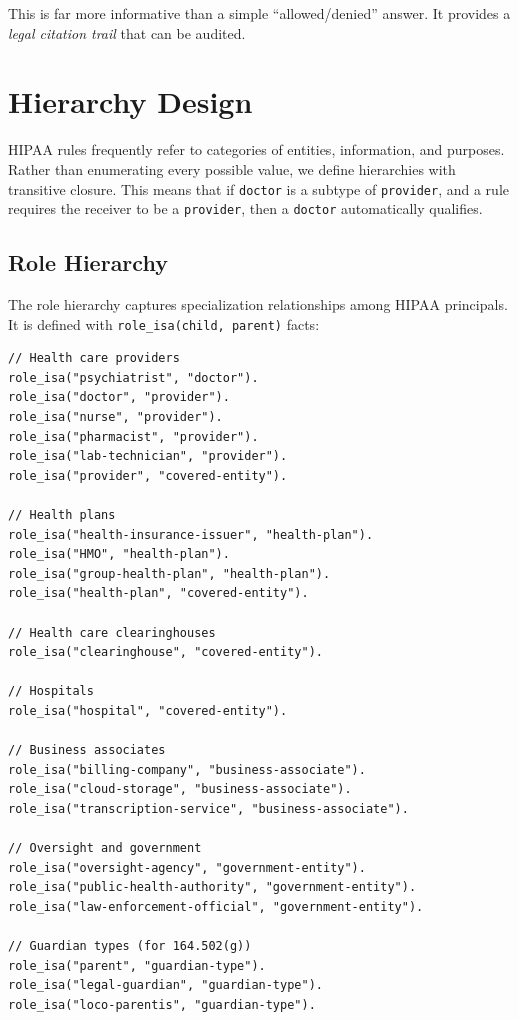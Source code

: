 \documentclass[11pt,letterpaper]{article}
\begin{document}
This is far more informative than a simple ``allowed/denied'' answer. It provides a \emph{legal citation trail} that can be audited.


\section{Hierarchy Design}
\label{sec:hierarchies}

HIPAA rules frequently refer to categories of entities, information, and purposes. Rather than enumerating every possible value, we define hierarchies with transitive closure. This means that if \texttt{doctor} is a subtype of \texttt{provider}, and a rule requires the receiver to be a \texttt{provider}, then a \texttt{doctor} automatically qualifies.

\subsection{Role Hierarchy}

The role hierarchy captures specialization relationships among HIPAA principals. It is defined with \texttt{role\_isa(child, parent)} facts:

\begin{lstlisting}[style=soufflestyle,caption={Role hierarchy from hipaa\_hierarchies.dl}]
// Health care providers
role_isa("psychiatrist", "doctor").
role_isa("doctor", "provider").
role_isa("nurse", "provider").
role_isa("pharmacist", "provider").
role_isa("lab-technician", "provider").
role_isa("provider", "covered-entity").

// Health plans
role_isa("health-insurance-issuer", "health-plan").
role_isa("HMO", "health-plan").
role_isa("group-health-plan", "health-plan").
role_isa("health-plan", "covered-entity").

// Health care clearinghouses
role_isa("clearinghouse", "covered-entity").

// Hospitals
role_isa("hospital", "covered-entity").

// Business associates
role_isa("billing-company", "business-associate").
role_isa("cloud-storage", "business-associate").
role_isa("transcription-service", "business-associate").

// Oversight and government
role_isa("oversight-agency", "government-entity").
role_isa("public-health-authority", "government-entity").
role_isa("law-enforcement-official", "government-entity").

// Guardian types (for 164.502(g))
role_isa("parent", "guardian-type").
role_isa("legal-guardian", "guardian-type").
role_isa("loco-parentis", "guardian-type").
\end{lstlisting}
\end{document}
